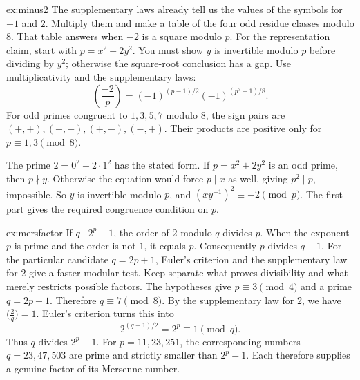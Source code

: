 \begin{solution}{ex:minus2}
\idea The supplementary laws already tell us the values of the symbols for $-1$ and $2$. Multiply them and make a table of the four odd residue classes modulo $8$. That table answers when $-2$ is a square modulo $p$. For the representation claim, start with $p=x^2+2y^2$. You must show $y$ is invertible modulo $p$ before dividing by $y^2$; otherwise the square-root conclusion has a gap.
\writeup Use multiplicativity and the supplementary laws:
\[
\left(\frac{-2}p\right)
=(-1)^{(p-1)/2}(-1)^{(p^2-1)/8}.
\]
For odd primes congruent to $1,3,5,7$ modulo $8$, the sign pairs are $(+,+),(-,-),(+,-),(-,+)$. Their products are positive only for $p\equiv1,3\pmod8$.

The prime $2=0^2+2\cdot1^2$ has the stated form. If $p=x^2+2y^2$ is an odd prime, then $p\nmid y$. Otherwise the equation would force $p\mid x$ as well, giving $p^2\mid p$, impossible. So $y$ is invertible modulo $p$, and $(xy^{-1})^2\equiv-2\pmod p$. The first part gives the required congruence condition on $p$.
\end{solution}

\begin{solution}{ex:mersfactor}
\idea If $q\mid2^p-1$, the order of $2$ modulo $q$ divides $p$. When the exponent $p$ is prime and the order is not $1$, it equals $p$. Consequently $p$ divides $q-1$. For the particular candidate $q=2p+1$, Euler's criterion and the supplementary law for $2$ give a faster modular test. Keep separate what proves divisibility and what merely restricts possible factors.
\writeup The hypotheses give $p\equiv3\pmod4$ and a prime $q=2p+1$. Therefore $q\equiv7\pmod8$. By the supplementary law for $2$, we have $\bigl(\frac2q\bigr)=1$. Euler's criterion turns this into
\[
2^{(q-1)/2}=2^p\equiv1\pmod q.
\]
Thus $q$ divides $2^p-1$. For $p=11,23,251$, the corresponding numbers $q=23,47,503$ are prime and strictly smaller than $2^p-1$. Each therefore supplies a genuine factor of its Mersenne number.
\end{solution}

